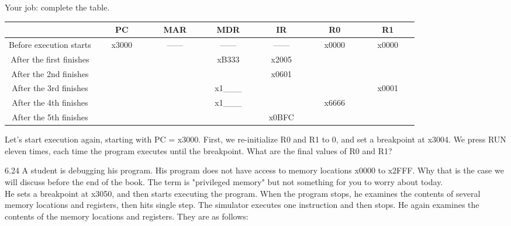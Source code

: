 \documentclass{patt}
\begin{document}
\begin{exercises}
\noindent
Your job: complete the table.

\vspace{0.25in}
\noindent
\begin{tabular} { |c|c|c|c|c|c|c| }
  \hline
  & \textbf{PC} & \textbf{MAR} & \textbf{MDR} & \textbf{IR} & \textbf{R0} &
  \textbf{R1} \\
  \hline
  Before execution starts & x3000 & ------ & ------ & ------ & x0000 & x0000 \\
  \hline
  After the first finishes &  &  & xB333 & x2005 & \ \ \ \ \ \ \ \ \ \ \ & \ \ \ \ \ \ \ \ \ \ \ \\
  \hline
  After the 2nd finishes &  &  &  & x0601 &  & \\
  \hline
  After the 3rd finishes &  &  & x1\_\_\_ &  &  & x0001 \\
  \hline
  After the 4th finishes & \ \ \ \ \ \ \ \ \ \ \ & \ \ \ \ \ \ \ \ \ \ \ &
  x1\_\_\_ & \ \ \ \ \ \ \ \ \ \ \ & x6666 & \\
  \hline
  After the 5th finishes &  &  & \ \ \ \ \ \ \ \ \ \ \ & x0BFC &  & \\
  \hline
\end{tabular}


Let's start execution again, starting with PC = x3000.
First, we re-initialize R0 and R1 to 0, and set a breakpoint at x3004.
We press RUN eleven times, each time the program executes until the
breakpoint. What are the final values of R0 and R1?

\item[6.24] A student is debugging his program.  His program does not have access to
memory locations x0000 to x2FFF.  Why that is the case we will discuss
before the end of the book.  The term is "privileged memory" but not
something for you to worry about today. \\

\noindent
He sets a breakpoint at x3050, and then starts executing the program.  When
the program stops, he examines the contents of several memory locations and
registers, then hits single step.  The simulator executes one instruction
and then stops.  He again examines the contents of the memory      locations and
registers.  They are as follows:


\end{exercises}
\end{document}
